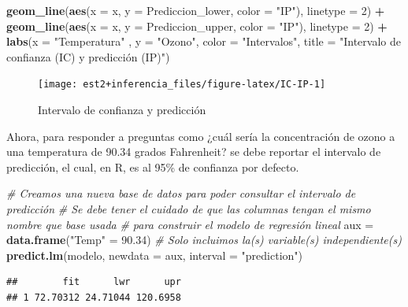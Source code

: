 \documentclass[
  11pt,
]{book}
\newenvironment{Shaded}{\begin{snugshade}}{\end{snugshade}}
\newcommand{\AttributeTok}[1]{\textcolor[rgb]{0.13,0.29,0.53}{#1}}
\newcommand{\CommentTok}[1]{\textcolor[rgb]{0.56,0.35,0.01}{\textit{#1}}}
\newcommand{\DecValTok}[1]{\textcolor[rgb]{0.00,0.00,0.81}{#1}}
\newcommand{\FloatTok}[1]{\textcolor[rgb]{0.00,0.00,0.81}{#1}}
\newcommand{\FunctionTok}[1]{\textcolor[rgb]{0.13,0.29,0.53}{\textbf{#1}}}
\newcommand{\NormalTok}[1]{#1}
\newcommand{\OtherTok}[1]{\textcolor[rgb]{0.56,0.35,0.01}{#1}}
\newcommand{\SpecialCharTok}[1]{\textcolor[rgb]{0.81,0.36,0.00}{\textbf{#1}}}
\newcommand{\StringTok}[1]{\textcolor[rgb]{0.31,0.60,0.02}{#1}}
\theoremstyle{definition}
\theoremstyle{definition}
\theoremstyle{definition}
\theoremstyle{definition}
\theoremstyle{remark}
\begin{document}
\begin{Shaded}
\begin{Highlighting}[]
  \FunctionTok{geom\_line}\NormalTok{(}\FunctionTok{aes}\NormalTok{(}\AttributeTok{x =}\NormalTok{ x, }\AttributeTok{y =}\NormalTok{ Prediccion\_lower, }\AttributeTok{color =} \StringTok{"IP"}\NormalTok{), }\AttributeTok{linetype =} \DecValTok{2}\NormalTok{) }\SpecialCharTok{+}
  \FunctionTok{geom\_line}\NormalTok{(}\FunctionTok{aes}\NormalTok{(}\AttributeTok{x =}\NormalTok{ x, }\AttributeTok{y =}\NormalTok{ Prediccion\_upper, }\AttributeTok{color =} \StringTok{"IP"}\NormalTok{), }\AttributeTok{linetype =} \DecValTok{2}\NormalTok{) }\SpecialCharTok{+}
  \FunctionTok{labs}\NormalTok{(}\AttributeTok{x =} \StringTok{"Temperatura"}\NormalTok{ , }\AttributeTok{y =} \StringTok{"Ozono"}\NormalTok{, }\AttributeTok{color =} \StringTok{"Intervalos"}\NormalTok{,}
       \AttributeTok{title =} \StringTok{"Intervalo de confianza (IC) y predicción (IP)"}\NormalTok{)}
\end{Highlighting}
\end{Shaded}

\begin{figure}

{\centering \texttt{[image: est2+inferencia\_files/figure-latex/IC-IP-1]} 

}

\caption{Intervalo de confianza y predicción}\label{fig:IC-IP}
\end{figure}

Ahora, para responder a preguntas como ¿cuál sería la concentración de ozono a una temperatura de 90.34 grados Fahrenheit? se debe reportar el intervalo de predicción, el cual, en R, es al 95\% de confianza por defecto.

\begin{Shaded}
\begin{Highlighting}[]
\CommentTok{\# Creamos una nueva base de datos para poder consultar el intervalo de predicción}
\CommentTok{\# Se debe tener el cuidado de que las columnas tengan el mismo nombre que base usada}
\CommentTok{\# para construir el modelo de regresión lineal}
\NormalTok{aux }\OtherTok{=} \FunctionTok{data.frame}\NormalTok{(}\StringTok{"Temp"} \OtherTok{=} \FloatTok{90.34}\NormalTok{) }\CommentTok{\# Solo incluimos la(s) variable(s) independiente(s)}
\FunctionTok{predict.lm}\NormalTok{(modelo, }\AttributeTok{newdata =}\NormalTok{ aux, }\AttributeTok{interval =} \StringTok{"prediction"}\NormalTok{)}
\end{Highlighting}
\end{Shaded}

\begin{verbatim}
##        fit      lwr      upr
## 1 72.70312 24.71044 120.6958
\end{verbatim}
\end{document}
